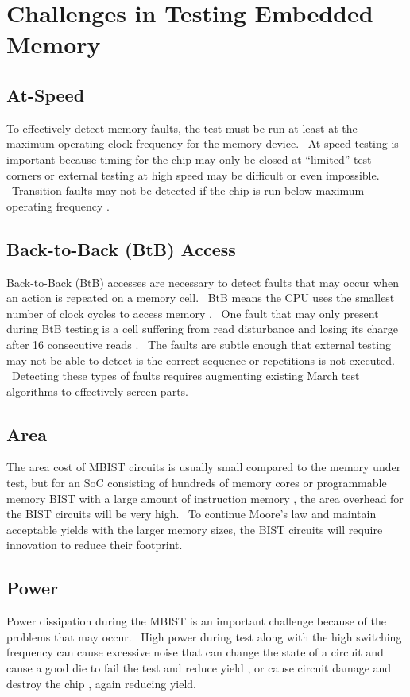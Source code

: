 \section{Challenges in Testing Embedded Memory}
\label{sect:bg-challenges}

\subsection{At-Speed}
To effectively detect memory faults, the test must be run at least at the maximum operating clock frequency for the memory device.  At-speed testing is important because timing for the chip may only be closed at “limited” test corners or external testing at high speed may be difficult or even impossible.  Transition faults may not be detected if the chip is run below maximum operating frequency \cite{1583992}.  

\subsection{Back-to-Back (BtB) Access}
Back-to-Back (BtB) accesses are necessary to detect faults that may occur when an action is repeated on a memory cell.  BtB means the CPU uses the smallest number of clock cycles to access memory \cite{5491773}.  One fault that may only present during BtB testing is a cell suffering from read disturbance and losing its charge after 16 consecutive reads \cite{4079351}.  The faults are subtle enough that external testing may not be able to detect is the correct sequence or repetitions is not executed.  Detecting these types of faults requires augmenting existing March test algorithms to effectively screen parts.  

\subsection{Area}
The area cost of MBIST circuits is usually small compared to the memory under test, but for an SoC consisting of hundreds of memory cores \cite{4711617} or programmable memory BIST with a large amount of instruction memory \cite{5692281}, the area overhead for the BIST circuits will be very high.  To continue Moore’s law and maintain acceptable yields with the larger memory sizes, the BIST circuits will require innovation to reduce their footprint.

\subsection{Power}
Power dissipation during the MBIST is an important challenge because of the problems that may occur.  High power during test along with the high switching frequency can cause excessive noise that can change the state of a circuit and cause a good die to fail the test and reduce yield \cite{oldref-15}, or cause circuit damage and destroy the chip \cite{oldref-16}, again reducing yield.


